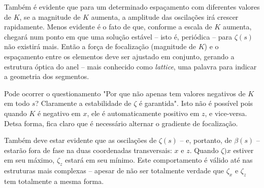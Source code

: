 Também é evidente que para um determinado espaçamento com diferentes valores de $K$, se a magnitude de $K$ aumenta, a amplitude das oscilações irá crescer rapidamente. Menos evidente é o fato de que, conforme a escala de $K$ aumenta, chegará num ponto em que uma solução estável -- isto é, periódica -- para $\zeta(s)$ não existirá mais. Então a força de focalização (magnitude de $K$) e o espaçamento entre os elementos deve ser ajustado em conjunto, gerando a estrutura óptica do anel -- mais conhecido como \textit{lattice}, uma palavra para indicar a geometria dos segmentos.

Pode ocorrer o questionamento "Por que não apenas tem valores negativos de $K$ em todo $s$? Claramente a estabilidade de $\zeta$ é garantida". Isto não é possível pois quando $K$ é negativo em $x$, ele é automaticamente positivo em $z$, e vice-versa. Detsa forma, fica claro que é necessário alternar o gradiente de focalização.

Também deve estar evidente que as oscilações de $\zeta(s)$ -- e, portanto, de $\beta(s)$ -- estarão fora de fase na duas coordenadas transversais: $x$ e $z$. Quando $\zeta)x$ estiver em seu máximo, $\zeta_z$ estará em seu mínimo. Este comportamento é válido até nas estruturas mais complexas -- apesar de não ser totalmente verdade que $\zeta_x$ e $\zeta_z$ tem totalmente a mesma forma. 


